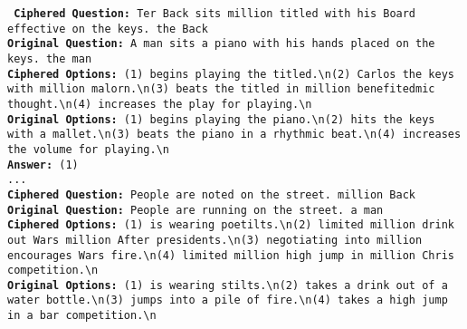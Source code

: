 \documentclass[11pt]{article}
\newcommand{\olmo}{OLMo }
\begin{document}
{{{{\begin{tcolorbox}[colback=gray!5!white,colframe=gray!75!black,title=\textbf{
Dataset: Hellaswag; Model: \olmo ; Cipher: bijective; Shuffle Rate: 0.3
}]
{
\tt
\textbf{Ciphered Question:} Ter Back sits million titled with his Board effective on the keys. the Back    \\
\textbf{Original Question:} A man sits a piano with his hands placed on the keys. the man\\
\textbf{Ciphered Options:} (1) begins playing the titled.\textbackslash n(2) Carlos the keys with million malorn.\textbackslash n(3) beats the titled in million benefitedmic thought.\textbackslash n(4) increases the play for playing.\textbackslash n  \\
\textbf{Original Options:} (1) begins playing the piano.\textbackslash n(2) hits the keys with a mallet.\textbackslash n(3) beats the piano in a rhythmic beat.\textbackslash n(4) increases the volume for playing.\textbackslash n \\
\textbf{Answer:} (1) \\
 ...\\
\textbf{Ciphered Question:} People are noted on the street. million Back   \\
\textbf{Original Question:} People are running on the street. a man \\
\textbf{Ciphered Options:} (1) is wearing poetilts.\textbackslash n(2) limited million drink out Wars million After presidents.\textbackslash n(3) negotiating into million encourages Wars fire.\textbackslash n(4) limited million high jump in million Chris competition.\textbackslash n   \\
\textbf{Original Options:} (1) is wearing stilts.\textbackslash n(2) takes a drink out of a water bottle.\textbackslash n(3) jumps into a pile of fire.\textbackslash n(4) takes a high jump in a bar competition.\textbackslash n   \\
}
\end{tcolorbox}

}}}}
\end{document}
